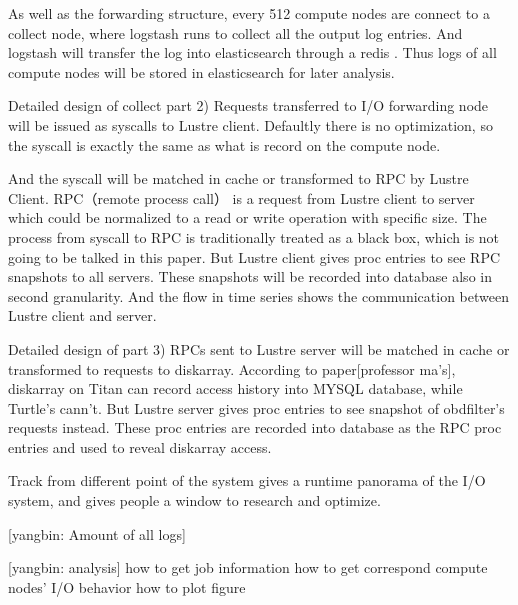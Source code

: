 \documentclass{article}
\begin{document}
As well as the forwarding structure, every 512 compute nodes are connect to a collect node, where logstash runs to collect all the output log entries. And logstash will transfer the log into elasticsearch through a redis . Thus logs of all compute nodes will be stored in elasticsearch for later analysis.

Detailed design of collect part 2)
Requests transferred to I/O forwarding node will be issued as syscalls to Lustre client. Defaultly there is no optimization, so the syscall is exactly the same as 
what is record on the compute node.

And the syscall will be matched in cache or transformed to RPC by Lustre Client. RPC（remote process call） is a request from Lustre client to server which could be normalized to a read or write operation with specific size. The process from syscall to RPC is traditionally treated as a black box, which is not going to be talked in this paper. But Lustre client gives proc entries to see RPC snapshots to all servers. These snapshots will be recorded into database also in second granularity. And the flow in time series shows the communication between Lustre client and server.

Detailed design of part 3)
RPCs sent to Lustre server will be matched in cache or  transformed to requests to diskarray. According to paper[professor ma's], diskarray on Titan can record access history into MYSQL database, while Turtle's cann't. But Lustre server gives proc entries to see snapshot of obdfilter's requests instead. These proc entries are recorded into database as the RPC proc entries and used to reveal diskarray access.

Track from different point of the system gives a runtime panorama of the I/O system, and gives people a window to research and optimize. 

[yangbin: Amount of all logs]

[yangbin: analysis]
how to get job information
how to get correspond compute nodes' I/O behavior
how to plot figure

\ifx\allfiles\undefined
\end{document}
